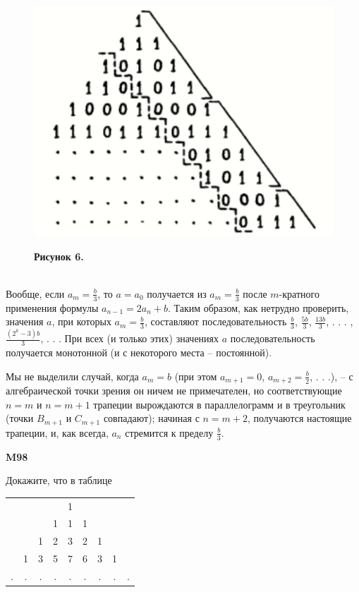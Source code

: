 \begin{figure}[h]
    \centering
    \includegraphics[width=\linewidth]{ktexu.png}
    \begin{flushleft}
    \textbf{Рисунок 6.}
    \end{flushleft}
\end{figure}\\
Вообще, если $a_m = \frac{b}{3}$, то $a=a_0$ получается из $a_m=\frac{b}{3}$ после $m$-кратного применения формулы $a_{n-1} = 2a_n+b$. Таким образом, как нетрудно проверить, значения $a$, при которых $a_m = \frac{b}{3}$, составляют последовательность $\frac{b}{3}$, $\frac{5b}{3}$, $\frac{13b}{3}$, . . . , $\frac{(2^k-3)b}{3}$, . . . При всех (и только этих) значениях $a$ последовательность получается монотонной (и с некоторого места -- постоянной). \par Мы не выделили случай, когда $a_m = b$ (при этом $a_{m+1} = 0$, $a_{m+2}=\frac{b}{2}$, . . .), -- с алгебраической точки зрения он ничем не примечателен, но соответствующие $n=m$ и $n=m+1$ трапеции вырождаются в параллелограмм и в треугольник (точки $B_{m+1}$ и $C_{m+1}$ совпадают); начиная с $n=m+2$, получаются настоящие трапеции, и, как всегда, $a_n$ стремится к пределу $\frac{b}{3}$.
\begin{center}
    \large \textbf{M98}
\end{center}
\par Докажите, что в таблице\\
\begin{center}
\begin{tabular}{c c c c c c c c c}
    &&&&1&&&& \\
    &&&1&1&1&&& \\
    &&1&2&3&2&1&&\\
    &1&3&5&7&6&3&1&\\
    .&.&.&.&.&.&.&.&.\\
\end{tabular}
\end{center}
